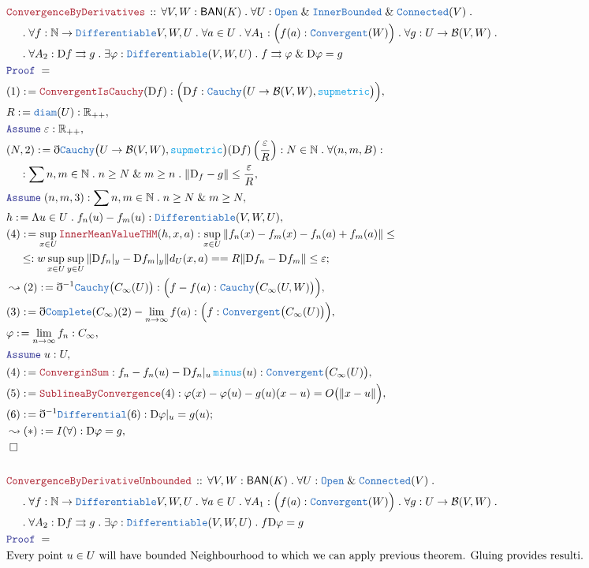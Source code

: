 \documentclass[12pt]{scrartcl}
\newcommand{\TYPE}[1]{\textcolor{NavyBlue}{\mathtt{#1}}}
\newcommand{\FUNC}[1]{\textcolor{Cerulean}{\mathtt{#1}}}
\newcommand{\LOGIC}[1]{\textcolor{Blue}{\mathtt{#1}}}
\newcommand{\THM}[1]{\textcolor{Maroon}{\mathtt{#1}}}
\renewcommand{\.}{\; . \;}
\newcommand{\de}{: \kern 0.1pc =}
\newcommand{\Theorem}[2]{& \THM{#1} \, :: \, #2 \\ & \Proof = \\ }
\newcommand{\NewLine}{\\ & \kern 1pc}
\newcommand{\Page}[1]{\begin{align*} #1 \end{align*}   }
\newcommand{ \bd }{ \ByDef }
\renewcommand{\And}{\; \& \;}
\newcommand{\Reals}{\mathbb{R} }
\newcommand{\Nat}{\mathbb{N} }
\newcommand{\Say}[3]{& #1 \de #2 : #3, \\}
\newcommand{\Conclude}[3]{& #1 \de #2 : #3; \\}
\newcommand{\Derive}[3]{& \leadsto #1 \de #2 : #3, \\}
\newcommand{\A}{\LOGIC{Assume} \;}
\newcommand{\Assume}[2]{& \A #1 : #2, \\}
\newcommand{\QED}{\; \square}
\newcommand{\EndProof}{& \QED \\}
\newcommand{\ByDef}{\eth}
\newcommand{\Proof}{\LOGIC{Proof} \; }
\newcommand{\ToU}{\rightrightarrows}
\newcommand{\BAN}{\mathsf{BAN}} %
\newcommand{\D}{\mathrm{D}}
\newcommand{\B}{\mathcal{B}}
\begin{document}
\Page{
	\Theorem{ConvergenceByDerivatives}
	{  
		\forall V,W : \BAN(K) \. \forall U : \TYPE{Open} \And \TYPE{InnerBounded} \And \TYPE{Connected}(V) \.
		\NewLine \.
		\forall f : \Nat \to \TYPE{Differentiable}{V,W,U} \.
		\forall a \in U \. \forall A_1 : \Big( f(a) : \TYPE{Convergent}(W)  \Big) \.
		\forall g : U  \to \B(V,W) \.  
		\NewLine \.
		\forall A_2 : \D f \ToU g \.
		\exists \varphi : \TYPE{Differentiable}(V,W,U) \. f \ToU \varphi \And  \D \varphi = g
	}
	\Say{(1)}{\THM{ConvergentIsCauchy}(\D f)}{\Big( \D f : \TYPE{Cauchy}\big( U \to \B(V,W),\FUNC{supmetric} \big) \Big)}
	\Say{R}{\TYPE{diam}(U)}{\Reals_{++}}
	\Assume{\varepsilon}{\Reals_{++}}
	\Say{(N,2)}{\bd \TYPE{Cauchy}\big(U \to \B(V,W),\FUNC{supmetric}\big)(\D f)\left( \frac{\varepsilon}{R} \right)}
	{
		N \in \Nat \. 
		\forall (n,m,B) : 
		\NewLine :
		\sum n,m \in \Nat \. n \ge N \And m \ge n \. \| \D_f - g \| \le \frac{\varepsilon}{R} 
	}
	\Assume{(n,m,3)}{ \sum n,m \in \Nat \. n \ge N \And m \ge N}
	\Say{h}{\Lambda u \in U \. f_n(u) - f_m(u)}{\TYPE{Differentiable}(V,W,U)} 
	\Conclude{(4)}{ \sup_{x \in U} \THM{InnerMeanValueTHM}(h,x,a)}
	{
		\sup_{x \in U}	\| f_n(x) - f_m( x) - f_n(a) + f_m(a) \| \le 
		\NewLine \le:w
		\sup_{x \in U }\sup_{y  \in  U}\| \D f_n|_y  - \D f_m|_y  \| d_U(x,a)  =
		= R\| \D f_n - \D f_m \| \le \varepsilon
	}
	\Derive{(2)}{ \bd^{-1} \TYPE{Cauchy}\big(C_\infty(U)\big)  }{ \Big( f - f(a) : \TYPE{Cauchy}\big( C_\infty(U,W) \big)  \Big) }
	\Say{(3)}{ \bd \TYPE{Complete}(C_\infty)(2) - \lim_{n \to \infty} f(a) }{ \Big( f : \TYPE{Convergent}\big( C_\infty(U) \big) \Big)}
	\Say{\varphi}{ \lim_{n \to \infty} f_n }{ C_\infty}
	\Assume{u}{U}
	\Say{(4)}{\THM{ConverginSum}}{ f_n - f_n(u) - \D f_n |_u \, \FUNC{minus}(u) : \TYPE{Convergent}\big( C_\infty(U) \big)}
	\Say{(5)}{ \THM{SublineaByConvergence}(4)}
	{        
	   \varphi(x) - \varphi(u) - g(u)(x -u) = O\big( \|x - u\|  \Big)
	}
	\Conclude{(6)}{\bd^{-1} \TYPE{Differential}(6)}{ \D \varphi |_u = g(u)   }
	\Derive{(*)}{ I(\forall)  }{ \D \varphi = g }
	\EndProof
	\\
	\Theorem{ConvergenceByDerivativeUnbounded}
	{  
		\forall V,W : \BAN(K) \. \forall U : \TYPE{Open}  \And \TYPE{Connected}(V) \.
		\NewLine \.
		\forall f : \Nat \to \TYPE{Differentiable}{V,W,U} \.
		\forall a \in U \. \forall A_1 : \Big( f(a) : \TYPE{Convergent}(W)  \Big) \.
		\forall g : U  \to \B(V,W) \.  
		\NewLine \.
		\forall A_2 : \D f \ToU g \.
		\exists \varphi : \TYPE{Differentiable}(V,W,U) \. f  \D \varphi = g
	}
	& \textrm{Every point $u \in U$ will have bounded Neighbourhood to which  we can apply previous theorem. Gluing provides resulti.} \\
}
\end{document}
